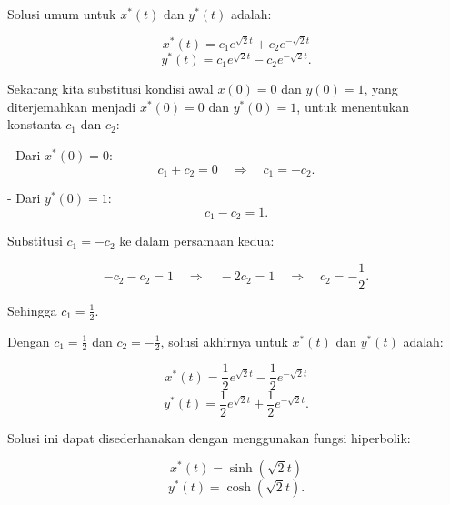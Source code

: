 \documentclass{article}
\begin{document}
Solusi umum untuk \( x^*(t) \) dan \( y^*(t) \) adalah:

\[
x^*(t) = c_1 e^{\sqrt{2} t} + c_2 e^{-\sqrt{2} t}
\]
\[
y^*(t) = c_1 e^{\sqrt{2} t} - c_2 e^{-\sqrt{2} t}.
\]

Sekarang kita substitusi kondisi awal \( x(0) = 0 \) dan \( y(0) = 1 \), yang diterjemahkan menjadi \( x^*(0) = 0 \) dan \( y^*(0) = 1 \), untuk menentukan konstanta \( c_1 \) dan \( c_2 \):

- Dari \( x^*(0) = 0 \):
  \[
  c_1 + c_2 = 0 \quad \Rightarrow \quad c_1 = -c_2.
  \]

- Dari \( y^*(0) = 1 \):
  \[
  c_1 - c_2 = 1.
  \]

Substitusi \( c_1 = -c_2 \) ke dalam persamaan kedua:

\[
-c_2 - c_2 = 1 \quad \Rightarrow \quad -2c_2 = 1 \quad \Rightarrow \quad c_2 = -\frac{1}{2}.
\]

Sehingga \( c_1 = \frac{1}{2} \).

Dengan \( c_1 = \frac{1}{2} \) dan \( c_2 = -\frac{1}{2} \), solusi akhirnya untuk \( x^*(t) \) dan \( y^*(t) \) adalah:

\[
x^*(t) = \frac{1}{2} e^{\sqrt{2} t} - \frac{1}{2} e^{-\sqrt{2} t}
\]
\[
y^*(t) = \frac{1}{2} e^{\sqrt{2} t} + \frac{1}{2} e^{-\sqrt{2} t}.
\]

Solusi ini dapat disederhanakan dengan menggunakan fungsi hiperbolik:

\[
x^*(t) = \sinh(\sqrt{2} t)
\]
\[
y^*(t) = \cosh(\sqrt{2} t).
\]
\end{document}
